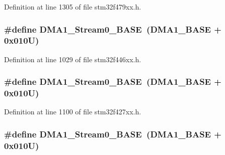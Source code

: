 Definition at line 1305 of file stm32f479xx.\+h.

\subsubsection[{\texorpdfstring{D\+M\+A1\+\_\+\+Stream0\+\_\+\+B\+A\+SE}{DMA1_Stream0_BASE}}]{\setlength{\rightskip}{0pt plus 5cm}\#define D\+M\+A1\+\_\+\+Stream0\+\_\+\+B\+A\+SE~({\bf D\+M\+A1\+\_\+\+B\+A\+SE} + 0x010\+U)}\hypertarget{group___peripheral__memory__map_ga0d3c52aa35dcc68f78b704dfde57ba95}{}\label{group___peripheral__memory__map_ga0d3c52aa35dcc68f78b704dfde57ba95}


Definition at line 1029 of file stm32f446xx.\+h.

\subsubsection[{\texorpdfstring{D\+M\+A1\+\_\+\+Stream0\+\_\+\+B\+A\+SE}{DMA1_Stream0_BASE}}]{\setlength{\rightskip}{0pt plus 5cm}\#define D\+M\+A1\+\_\+\+Stream0\+\_\+\+B\+A\+SE~({\bf D\+M\+A1\+\_\+\+B\+A\+SE} + 0x010\+U)}\hypertarget{group___peripheral__memory__map_ga0d3c52aa35dcc68f78b704dfde57ba95}{}\label{group___peripheral__memory__map_ga0d3c52aa35dcc68f78b704dfde57ba95}


Definition at line 1100 of file stm32f427xx.\+h.

\subsubsection[{\texorpdfstring{D\+M\+A1\+\_\+\+Stream0\+\_\+\+B\+A\+SE}{DMA1_Stream0_BASE}}]{\setlength{\rightskip}{0pt plus 5cm}\#define D\+M\+A1\+\_\+\+Stream0\+\_\+\+B\+A\+SE~({\bf D\+M\+A1\+\_\+\+B\+A\+SE} + 0x010\+U)}\hypertarget{group___peripheral__memory__map_ga0d3c52aa35dcc68f78b704dfde57ba95}{}\label{group___peripheral__memory__map_ga0d3c52aa35dcc68f78b704dfde57ba95}


